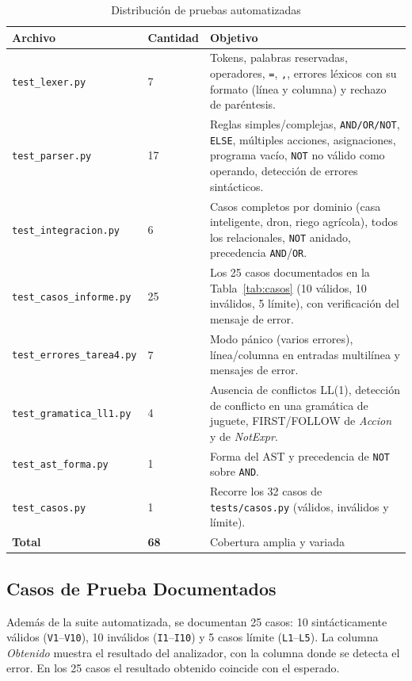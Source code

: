 \documentclass[12pt,a4paper]{article}
\begin{document}
\begin{table}[H]
\centering
\begin{tabular}{|l|l|p{7.5cm}|}
\hline
\textbf{Archivo} & \textbf{Cantidad} & \textbf{Objetivo} \\ 
\hline
\texttt{test\_lexer.py} & 7 & Tokens, palabras reservadas, operadores, \texttt{=}, \texttt{,}, errores léxicos con su formato (línea y columna) y rechazo de paréntesis. \\ 
\hline
\texttt{test\_parser.py} & 17 & Reglas simples/complejas, \texttt{AND/OR/NOT}, \texttt{ELSE}, múltiples acciones, asignaciones, programa vacío, \texttt{NOT} no válido como operando, detección de errores sintácticos. \\ 
\hline
\texttt{test\_integracion.py} & 6 & Casos completos por dominio (casa inteligente, dron, riego agrícola), todos los relacionales, \texttt{NOT} anidado, precedencia \texttt{AND}/\texttt{OR}. \\ 
\hline
\texttt{test\_casos\_informe.py} & 25 & Los 25 casos documentados en la Tabla~\ref{tab:casos} (10 válidos, 10 inválidos, 5 límite), con verificación del mensaje de error. \\ 
\hline
\texttt{test\_errores\_tarea4.py} & 7 & Modo pánico (varios errores), línea/columna en entradas multilínea y mensajes de error. \\ 
\hline
\texttt{test\_gramatica\_ll1.py} & 4 & Ausencia de conflictos LL(1), detección de conflicto en una gramática de juguete, FIRST/FOLLOW de \textit{Accion} y de \textit{NotExpr}. \\ 
\hline
\texttt{test\_ast\_forma.py} & 1 & Forma del AST y precedencia de \texttt{NOT} sobre \texttt{AND}. \\ 
\hline
\texttt{test\_casos.py} & 1 & Recorre los 32 casos de \texttt{tests/casos.py} (válidos, inválidos y límite). \\ 
\hline
\textbf{Total} & \textbf{68} & Cobertura amplia y variada \\ 
\hline
\end{tabular}
\caption{Distribución de pruebas automatizadas}
\label{tab:tests}
\end{table}

\subsection{Casos de Prueba Documentados}
\label{sec:casos}
Además de la suite automatizada, se documentan 25 casos: 10 sintácticamente válidos (\texttt{V1}--\texttt{V10}), 10 inválidos (\texttt{I1}--\texttt{I10}) y 5 casos límite (\texttt{L1}--\texttt{L5}). La columna \textit{Obtenido} muestra el resultado del analizador, con la columna donde se detecta el error. En los 25 casos el resultado obtenido coincide con el esperado.
\end{document}
